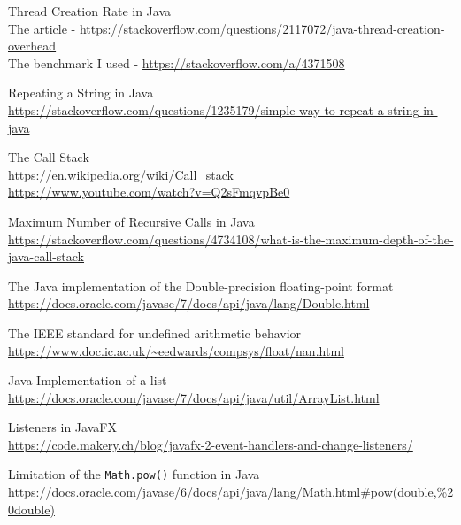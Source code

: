\documentclass[../../main.tex]{subfiles}
\begin{document}
\begin{thebibliography}{9}
Thread Creation Rate in Java\\
The article - \url{https://stackoverflow.com/questions/2117072/java-thread-creation-overhead}\\
The benchmark I used - \url{https://stackoverflow.com/a/4371508}

Repeating a String in Java\\
\url{https://stackoverflow.com/questions/1235179/simple-way-to-repeat-a-string-in-java}

The Call Stack\\
\url{https://en.wikipedia.org/wiki/Call_stack}\\
\url{https://www.youtube.com/watch?v=Q2sFmqvpBe0}

Maximum Number of Recursive Calls in Java\\
\url{https://stackoverflow.com/questions/4734108/what-is-the-maximum-depth-of-the-java-call-stack}

The Java implementation of the Double-precision floating-point format\\
\url{https://docs.oracle.com/javase/7/docs/api/java/lang/Double.html}

The IEEE standard for undefined arithmetic behavior\\
\url{https://www.doc.ic.ac.uk/~eedwards/compsys/float/nan.html}

Java Implementation of a list\\
\url{https://docs.oracle.com/javase/7/docs/api/java/util/ArrayList.html}

Listeners in JavaFX\\
\url{https://code.makery.ch/blog/javafx-2-event-handlers-and-change-listeners/}

Limitation of the \texttt{Math.pow()} function in Java\\
\url{https://docs.oracle.com/javase/6/docs/api/java/lang/Math.html#pow(double,%20double)}
\end{thebibliography}
\end{document}
